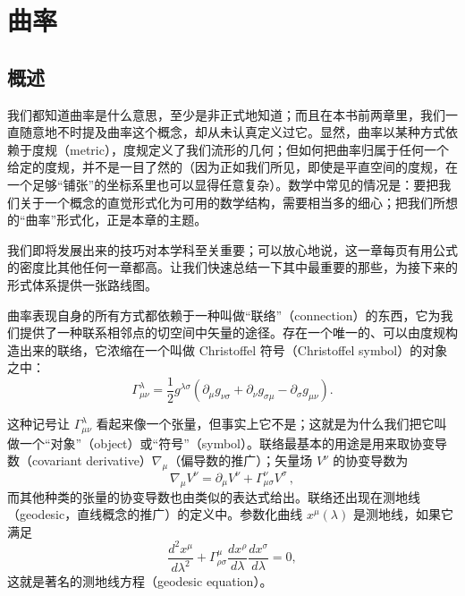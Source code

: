 
\chapter{曲率}

\section{概述}

我们都知道曲率是什么意思，至少是非正式地知道；而且在本书前两章里，我们一直随意地不时提及曲率这个概念，却从未认真定义过它。显然，曲率以某种方式依赖于度规（metric），度规定义了我们流形的几何；但如何把曲率归属于任何一个给定的度规，并不是一目了然的（因为正如我们所见，即使是平直空间的度规，在一个足够“铺张”的坐标系里也可以显得任意复杂）。数学中常见的情况是：要把我们关于一个概念的直觉形式化为可用的数学结构，需要相当多的细心；把我们所想的“曲率”形式化，正是本章的主题。

我们即将发展出来的技巧对本学科至关重要；可以放心地说，这一章每页有用公式的密度比其他任何一章都高。让我们快速总结一下其中最重要的那些，为接下来的形式体系提供一张路线图。

曲率表现自身的所有方式都依赖于一种叫做“联络”（connection）的东西，它为我们提供了一种联系相邻点的切空间中矢量的途径。存在一个唯一的、可以由度规构造出来的联络，它浓缩在一个叫做 Christoffel 符号（Christoffel symbol）的对象之中：
\begin{equation*}
\Gamma^\lambda_{\mu\nu} = \frac{1}{2} g^{\lambda\sigma}\left(\partial_\mu g_{\nu\sigma} + \partial_\nu g_{\sigma\mu} - \partial_\sigma g_{\mu\nu}\right).
\tag{3.1}
\end{equation*}

这种记号让 $\Gamma^\lambda_{\mu\nu}$ 看起来像一个张量，但事实上它不是；这就是为什么我们把它叫做一个“对象”（object）或“符号”（symbol）。联络最基本的用途是用来取协变导数（covariant derivative）$\nabla_\mu$（偏导数的推广）；矢量场 $V^\nu$ 的协变导数为
\begin{equation*}
\nabla_\mu V^\nu = \partial_\mu V^\nu + \Gamma^\nu_{\mu\sigma} V^\sigma\,,
\tag{3.2}
\end{equation*}
而其他种类的张量的协变导数也由类似的表达式给出。联络还出现在测地线（geodesic，直线概念的推广）的定义中。参数化曲线 $x^\mu(\lambda)$ 是测地线，如果它满足
\begin{equation*}
\frac{d^2 x^\mu}{d\lambda^2} + \Gamma^\mu_{\rho\sigma}\frac{d x^\rho}{d\lambda}\frac{d x^\sigma}{d\lambda} = 0,
\tag{3.3}
\end{equation*}
这就是著名的测地线方程（geodesic equation）。

